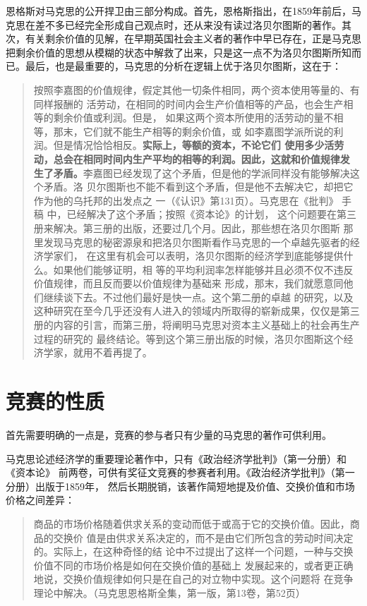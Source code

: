 恩格斯对马克思的公开捍卫由三部分构成。首先，恩格斯指出，在1859年前后，马克思在差不多已经完全形成自己观点时，还从来没有读过洛贝尔图斯的著作。其次，有关剩余价值的见解，在早期英国社会主义者的著作中早已存在，正是马克思把剩余价值的思想从模糊的状态中解救了出来，只是这一点不为洛贝尔图斯所知而已。最后，也是最重要的，马克思的分析在逻辑上优于洛贝尔图斯，这在于：

\begin{quotation}
  按照李嘉图的价值规律，假定其他一切条件相同，两个资本使用等量的、有同样报酬的
  活劳动，在相同的时间内会生产价值相等的产品，也会生产相等的剩余价值或利润。但是，
  如果这两个资本所使用的活劳动的量不相等，那末，它们就不能生产相等的剩余价值，或
  如李嘉图学派所说的利润。但是情况恰恰相反。\textbf{实际上，等额的资本，不论它们
    使用多少活劳动，总会在相同时间内生产平均的相等的利润。因此，这就和价值规律发
    生了矛盾。}李嘉图已经发现了这个矛盾，但是他的学派同样没有能够解决这个矛盾。洛
  贝尔图斯也不能不看到这个矛盾，但是他不去解决它，却把它作为他的乌托邦的出发点之
  一（《认识》第131页）。马克思在《批判》 手稿
  中，已经解决了这个矛盾；按照《资本论》的计划，
  这个问题要在第三册来解决。第三册的出版，还要过几个月。因此，那些想在洛贝尔图斯
  那里发现马克思的秘密源泉和把洛贝尔图斯看作马克思的一个卓越先驱者的经济学家们，
  在这里有机会可以表明，洛贝尔图斯的经济学到底能够提供什么。如果他们能够证明，相
  等的平均利润率怎样能够并且必须不仅不违反价值规律，而且反而要以价值规律为基础来
  形成，那末，我们就愿意同他们继续谈下去。不过他们最好是快一点。这个第二册的卓越
  的研究，以及这种研究在至今几乎还没有人进入的领域内所取得的崭新成果，仅仅是第三
  册的内容的引言，而第三册，将阐明马克思对资本主义基础上的社会再生产过程的研究的
  最终结论。等到这个第三册出版的时候，洛贝尔图斯这个经济学家，就用不着再提了。 
\end{quotation}

\section{竞赛的性质}
首先需要明确的一点是，竞赛的参与者只有少量的马克思的著作可供利用。

马克思论述经济学的重要理论著作中，只有《政治经济学批判》（第一分册）和《资本论》
前两卷，可供有奖征文竞赛的参赛者利用。《政治经济学批判》（第一分册）出版于1859年，
然后长期脱销，该著作简短地提及价值、交换价值和市场价格之间差异：

\begin{quotation}
商品的市场价格随着供求关系的变动而低于或高于它的交换价值。因此，商品的交换价
值是由供求关系决定的，而不是由它们所包含的劳动时间决定的。实际上，在这种奇怪的结
论中不过提出了这样一个问题，一种与交换价值不同的市场价格是如何在交换价值的基础上
发展起来的，或者更正确地说，交换价值规律如何只是在自己的对立物中实现。这个问题将
在竞争理论中解决。（马克思恩格斯全集，第一版，第13卷，第52页）
\end{quotation}

